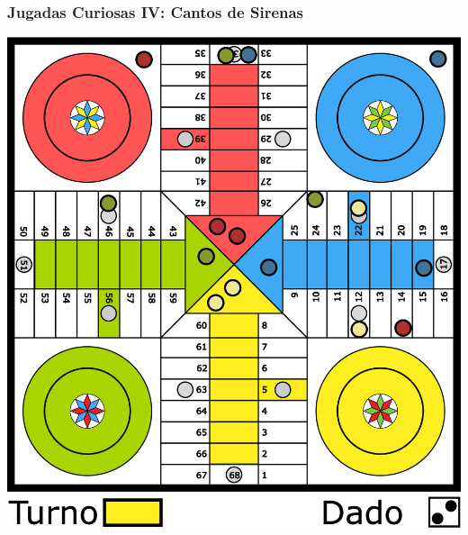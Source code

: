 \documentclass[a4paper,t,xcolor=pst,dvips,colortheme]{beamer}
\begin{document}
\begin{frame}[c]
    \frametitle{Jugadas Curiosas IV: Cantos de Sirenas}
    \begin{center}
        \includegraphics[width=0.5\linewidth]{images/neural/cantoSirenas.eps}
    \end{center}
\end{frame}
\end{document}
